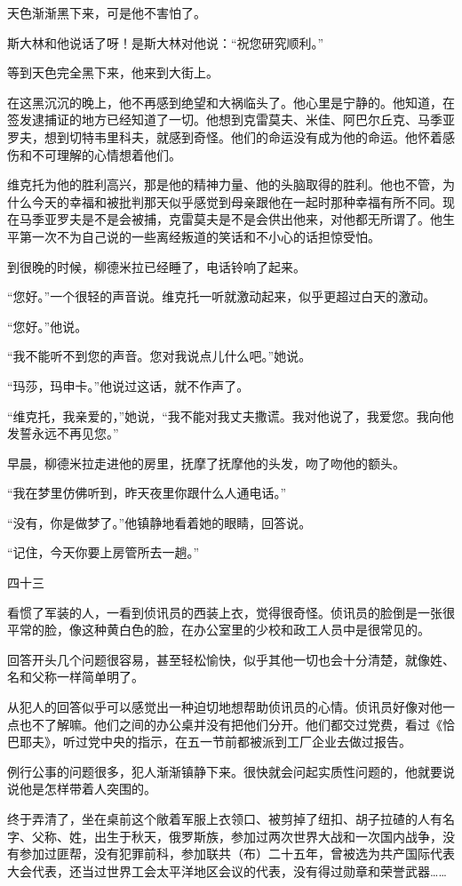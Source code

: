 天色渐渐黑下来，可是他不害怕了。

斯大林和他说话了呀！是斯大林对他说：“祝您研究顺利。”

等到天色完全黑下来，他来到大街上。

在这黑沉沉的晚上，他不再感到绝望和大祸临头了。他心里是宁静的。他知道，在签发逮捕证的地方已经知道了一切。他想到克雷莫夫、米佳、阿巴尔丘克、马季亚罗夫，想到切特韦里科夫，就感到奇怪。他们的命运没有成为他的命运。他怀着感伤和不可理解的心情想着他们。

维克托为他的胜利高兴，那是他的精神力量、他的头脑取得的胜利。他也不管，为什么今天的幸福和被批判那天似乎感觉到母亲跟他在一起时那种幸福有所不同。现在马季亚罗夫是不是会被捕，克雷莫夫是不是会供出他来，对他都无所谓了。他生平第一次不为自己说的一些离经叛道的笑话和不小心的话担惊受怕。

到很晚的时候，柳德米拉已经睡了，电话铃响了起来。

“您好。”一个很轻的声音说。维克托一听就激动起来，似乎更超过白天的激动。

“您好。”他说。

“我不能听不到您的声音。您对我说点儿什么吧。”她说。

“玛莎，玛申卡。”他说过这话，就不作声了。

“维克托，我亲爱的，”她说，“我不能对我丈夫撒谎。我对他说了，我爱您。我向他发誓永远不再见您。”

早晨，柳德米拉走进他的房里，抚摩了抚摩他的头发，吻了吻他的额头。

“我在梦里仿佛听到，昨天夜里你跟什么人通电话。”

“没有，你是做梦了。”他镇静地看着她的眼睛，回答说。

“记住，今天你要上房管所去一趟。”

四十三

看惯了军装的人，一看到侦讯员的西装上衣，觉得很奇怪。侦讯员的脸倒是一张很平常的脸，像这种黄白色的脸，在办公室里的少校和政工人员中是很常见的。

回答开头几个问题很容易，甚至轻松愉快，似乎其他一切也会十分清楚，就像姓、名和父称一样简单明了。

从犯人的回答似乎可以感觉出一种迫切地想帮助侦讯员的心情。侦讯员好像对他一点也不了解嘛。他们之间的办公桌并没有把他们分开。他们都交过党费，看过《恰巴耶夫》，听过党中央的指示，在五一节前都被派到工厂企业去做过报告。

例行公事的问题很多，犯人渐渐镇静下来。很快就会问起实质性问题的，他就要说说他是怎样带着人突围的。

终于弄清了，坐在桌前这个敞着军服上衣领口、被剪掉了纽扣、胡子拉碴的人有名字、父称、姓，出生于秋天，俄罗斯族，参加过两次世界大战和一次国内战争，没有参加过匪帮，没有犯罪前科，参加联共（布）二十五年，曾被选为共产国际代表大会代表，还当过世界工会太平洋地区会议的代表，没有得过勋章和荣誉武器……

